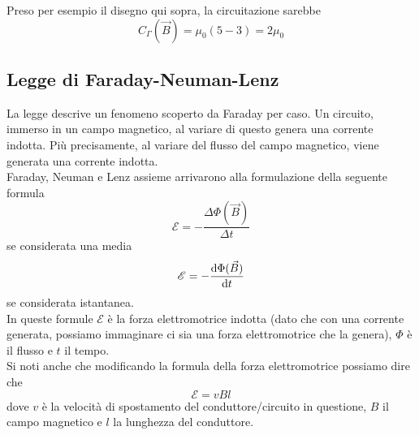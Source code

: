 \begin{center}
\end{center}

Preso per esempio il disegno qui sopra, la circuitazione sarebbe
\begin{equation*}
  C_\Gamma(\vec{B}) = \mu_0(5-3) = 2\mu_0
\end{equation*}

\subsection{Legge di Faraday-Neuman-Lenz}\label{subsec:mag:fnl}
La legge descrive un fenomeno scoperto da Faraday per caso. Un circuito, immerso in un campo
magnetico, al variare di questo genera una corrente indotta. Più precisamente, al variare
del flusso del campo magnetico, viene generata una corrente indotta.\\
Faraday, Neuman e Lenz assieme arrivarono alla formulazione della seguente formula
\begin{equation*}
  \mathcal{E} = -\frac{\Delta\Phi(\vec{B})}{\Delta t}
\end{equation*}
se considerata una media
\begin{equation*}
  \mathcal{E} = -\frac{\mathop{}\!\mathrm{d}\Phi(\vec{B})}{\mathop{}\!\mathrm{d} t}
\end{equation*}
se considerata istantanea.\\
In queste formule $\mathcal{E}$ è la forza elettromotrice indotta (dato che con una corrente
generata, possiamo immaginare ci sia una forza elettromotrice che la genera), $\Phi$ è il flusso
e $t$ il tempo.\\
Si noti anche che modificando la formula della forza elettromotrice possiamo dire che
\begin{equation*}
  \mathcal{E} = vBl
\end{equation*}
dove $v$ è la velocità di spostamento del conduttore/circuito in questione, $B$ il campo magnetico
e $l$ la lunghezza del conduttore.
